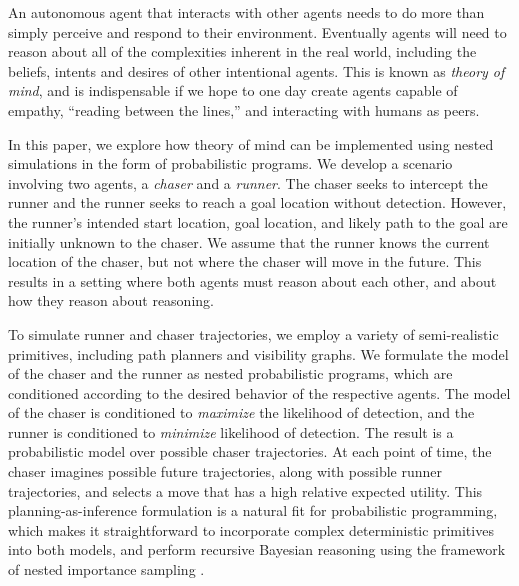 \documentclass[twoside]{article}
\begin{document}
An autonomous agent that interacts with other agents needs to do more than simply perceive and respond to their environment. 
Eventually agents will need to reason about all of
the complexities inherent in the real world, including 
the beliefs, intents and desires of other intentional agents.  This is
known as \textit{theory of mind}, and is indispensable if we hope to
one day create agents capable of empathy, ``reading between the
lines,'' and interacting with humans as peers. %

In this paper, we explore how theory of mind can be implemented using 
nested simulations in the form of probabilistic programs.
We develop a scenario involving two agents, a \textit{chaser} and
a \textit{runner}. %
The chaser seeks to intercept the runner and the runner seeks to reach a goal location without
detection. However, the runner's intended start location, goal
location, and likely path to the goal are initially unknown to the
chaser. We assume that the runner knows the current location of the 
chaser, but not where the chaser will move in the future. This results in a setting where both agents must reason about each other, and about how they reason about reasoning.




To simulate runner and chaser trajectories, we employ a 
variety of semi-realistic primitives, including path planners and 
visibility graphs. 
%
We formulate the model of the chaser and the runner
as nested probabilistic programs, which are conditioned according to the desired behavior of the respective agents. The model of the chaser is conditioned to 
\emph{maximize} the likelihood of detection, and the runner is conditioned to \emph{minimize} likelihood of detection.
%
The result is a probabilistic model over possible chaser trajectories. At each point of time, the chaser imagines 
possible future trajectories, along with possible runner trajectories, and selects 
a move that has a high relative expected utility. This planning-as-inference 
formulation \cite{toussaint06} is a natural fit for probabilistic programming, 
which makes it straightforward to incorporate complex deterministic primitives 
into both models, and perform recursive Bayesian reasoning using the framework 
of nested importance sampling \cite{naesseth2015nested}.
\end{document}
